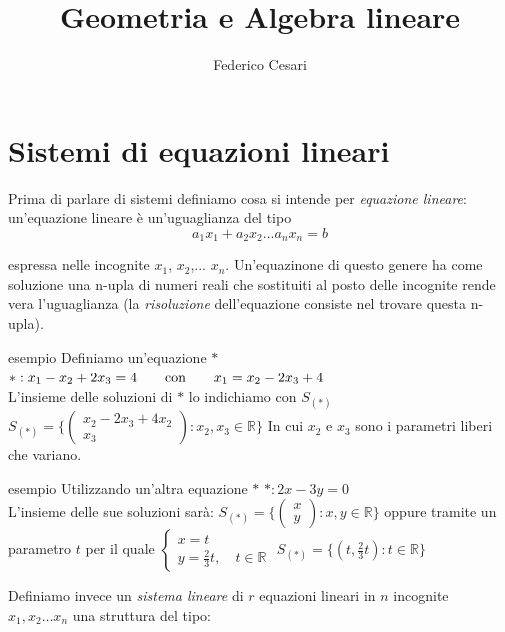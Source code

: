 \documentclass[x11names]{article}
\title{Geometria e Algebra lineare}
\author{Federico Cesari}
\date{}
\begin{document}

\tableofcontents
\newpage








\newpage
\section{Sistemi di equazioni lineari}
 Prima di parlare di sistemi definiamo cosa si intende per \textit{equazione lineare}: un'equazione lineare è un'uguaglianza del tipo  
 $$a_{1}x_{1} + a_{2}x_{2}... a_nx_n=b$$ 

 espressa nelle incognite $x_1$, $x_2$,... $x_n$. Un'equazinone di questo genere ha come soluzione una n-upla di numeri reali che sostituiti al posto delle incognite rende vera l'uguaglianza (la \textit{risoluzione} dell'equazione consiste nel trovare questa n-upla).

 \begin{es}{esempio}
     Definiamo un'equazione $*$ 
     $*:x_1 - x_2 + 2x_3 = 4 \qquad \textnormal{con} \qquad x_1 = x_2 - 2x_3 + 4$  \\
     L'insieme delle soluzioni di $*$ lo indichiamo con $S_{(*)}$ 
      $S_{(*)} = \Biggl\{\begin{pmatrix}x_2 - 2x_3 + 4 x_2 \\ x_3 \end{pmatrix}: x_2, x_3 \in \mathbb{R}\Biggl\} $ 
      In cui $x_2$ e $x_3$ sono i parametri liberi che variano.
 \end{es}

 \begin{es}{esempio}
     Utilizzando un'altra equazione $*$ 
     $*: 2x - 3y = 0$  \\
     L'insieme delle sue soluzioni sarà: 
     $S_{(*)} = \Biggl\{\begin{pmatrix}x \\ y \end{pmatrix}: x,y \in \mathbb{R}\Biggl\} $ 
     oppure tramite un parametro $t$ per il quale $\begin{cases}x=t\\y=\frac{2}{3}t ,\quad t \in \mathbb{R}\end{cases}$ 
      $S_{(*)} = \biggl\{(t,\frac{2}{3}t): t \in \mathbb{R}\biggl\} $
 \end{es}

 \vspace{2em}
 Definiamo invece un \textit{sistema lineare} di $r$ equazioni lineari in $n$ incognite $x_1, x_2 \dots x_n$ una struttura del tipo:
\end{document}
